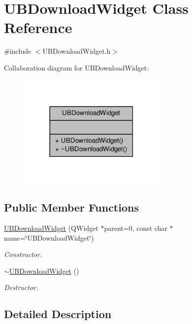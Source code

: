\hypertarget{class_u_b_download_widget}{\section{U\-B\-Download\-Widget Class Reference}
\label{db/d8b/class_u_b_download_widget}
}


{\ttfamily \#include $<$U\-B\-Download\-Widget.\-h$>$}



Collaboration diagram for U\-B\-Download\-Widget\-:
\nopagebreak
\begin{figure}[H]
\begin{center}
\leavevmode
\includegraphics[width=206pt]{da/d3c/class_u_b_download_widget__coll__graph}
\end{center}
\end{figure}
\subsection*{Public Member Functions}
\begin{DoxyCompactItemize}
\item 
\hyperlink{class_u_b_download_widget_aab012195b6f2e6b30fbff7a93d2ee5b2}{U\-B\-Download\-Widget} (Q\-Widget $\ast$parent=0, const char $\ast$name=\char`\"{}U\-B\-Download\-Widget\char`\"{})
\begin{DoxyCompactList}\small\item\em Constructor. \end{DoxyCompactList}\item 
\hyperlink{class_u_b_download_widget_a7bc5f87020a0955e97915757339ebe74}{$\sim$\-U\-B\-Download\-Widget} ()
\begin{DoxyCompactList}\small\item\em Destructor. \end{DoxyCompactList}\end{DoxyCompactItemize}


\subsection{Detailed Description}


